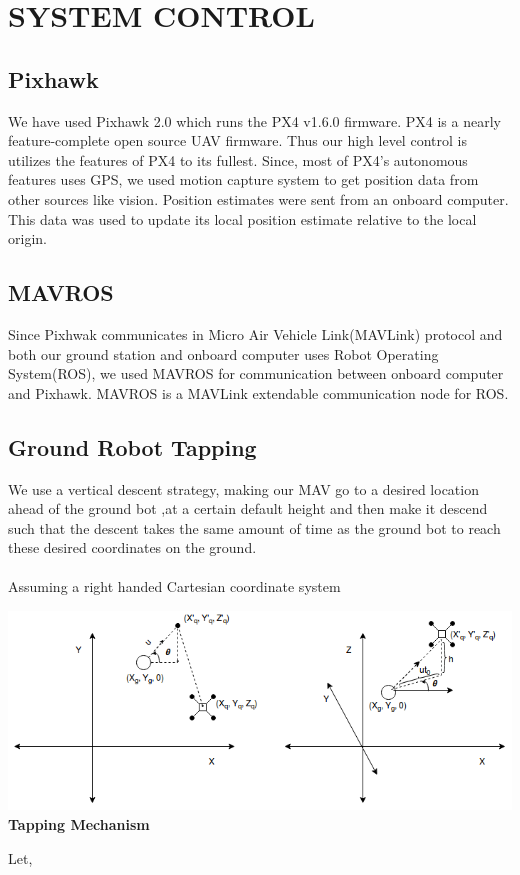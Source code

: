 \documentclass[12pt]{article}
\begin{document}
\section{SYSTEM CONTROL}
\subsection{Pixhawk}
    We have used Pixhawk 2.0 which runs the PX4 v1.6.0 firmware. PX4 is a nearly feature-complete open source UAV firmware. Thus our high level control is utilizes the features of PX4 to its fullest. Since, most of PX4’s autonomous features uses GPS, we used motion capture system to get position data from other sources like vision. Position estimates were sent from an onboard computer. This data was used to update its local position estimate relative to the local origin.  
\subsection{MAVROS}
    Since Pixhwak communicates in Micro Air Vehicle Link(MAVLink) protocol and both our ground station and onboard computer uses Robot Operating System(ROS), we used MAVROS for communication between onboard computer and Pixhawk. MAVROS is a MAVLink extendable communication node for ROS.
\subsection{Ground Robot Tapping}
    We use a vertical descent strategy, making our MAV go to a desired location ahead of the ground bot ,at a certain default height and then make it descend such that the descent takes the same amount of time as the ground bot to reach these desired coordinates on the ground. \\
\\ Assuming a right handed Cartesian coordinate system \\
\begin{center}
\includegraphics[scale=0.3]{tap}\\
\textbf{Tapping Mechanism}
\end{center}
Let,
    
\end{document}
